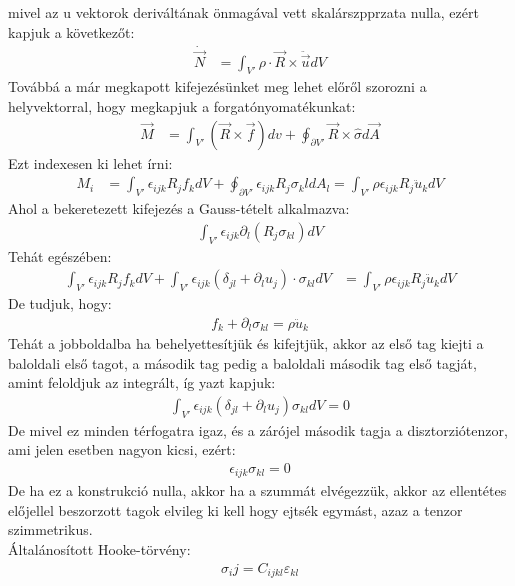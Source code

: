 \documentclass{article}
\begin{document}
mivel az u vektorok deriváltának önmagával vett skalárszpprzata nulla, ezért kapjuk a következőt:
\begin{align*}
\dot{\vec{N}} &= \int_{V'} \rho \cdot \vec{R} \times \ddot{\vec{u}} dV
\end{align*}
Továbbá a már megkapott kifejezésünket meg lehet előről szorozni a helyvektorral, hogy megkapjuk a forgatónyomatékunkat:
\begin{align*}
\vec{M} &= \int_{V'} (\vec{R} \times \vec{f}) dv + \oint_{\partial V'} \vec{R} \times \hat{\sigma} d\vec{A}
\end{align*}
Ezt indexesen ki lehet írni: 
\begin{align*}
M_i &= \int_{V'} \epsilon_{ijk} R_j f_k dV + \boxed{\oint_{\partial V'} \epsilon_{ijk} R_j \sigma_kl dA_l} = \int_{V'} \rho \epsilon_{ijk} R_j \ddot{u}_k dV
\end{align*}
Ahol a bekeretezett kifejezés a Gauss-tételt alkalmazva:
\begin{align*}
\int_{V'} \epsilon_{ijk} \partial_l (R_j \sigma_{kl}) dV
\end{align*}
Tehát egészében:
\begin{align*}
\int_{V'} \epsilon_{ijk} R_j f_k dV + \int_{V'} \epsilon_{ijk}(\delta_{jl} + \partial_l u_j)\cdot \sigma_{kl} dV &= \int_{V'} \rho \epsilon_{ijk} R_j \ddot{u} _k dV 
\end{align*}
De tudjuk, hogy: 
\begin{align*}
f_k +  \partial_l \sigma_{kl} =\rho \ddot{u}_k
\end{align*}
Tehát a jobboldalba ha behelyettesítjük és kifejtjük, akkor az első tag kiejti a baloldali első tagot, a második tag pedig a baloldali második tag első tagját, amint feloldjuk az integrált, íg yazt kapjuk:
\begin{align*}
\int_{V'} \epsilon_{ijk} (\delta_{jl} + \partial_{l}u_j)\sigma_{kl} dV =0
\end{align*}
De mivel ez minden térfogatra igaz, és a zárójel második tagja a disztorziótenzor, ami jelen esetben nagyon kicsi, ezért:
\begin{align*}
\epsilon_{ijk}\sigma_{kl} = 0
\end{align*}
De ha ez a konstrukció nulla, akkor ha a szummát elvégezzük, akkor az ellentétes előjellel beszorzott tagok elvileg ki kell hogy ejtsék egymást, azaz a tenzor szimmetrikus. \\
Általánosított Hooke-törvény:
\begin{align*}
\sigma_ij = C_{ijkl}\varepsilon_{kl}
\end{align*}
\end{document}

